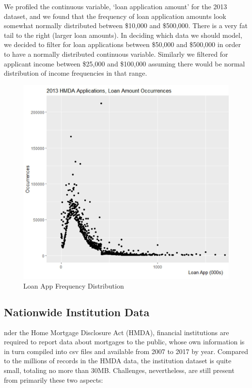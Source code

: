\documentclass[conference,compsoc]{IEEEtran}
\begin{document}
We profiled the continuous variable, ‘loan application amount’ for the 2013 dataset, and we found that the frequency of loan application amounts look somewhat normally distributed between \$10,000 and \$500,000.  There is a very fat tail to the right (larger loan amounts).  In deciding which data we should model, we decided to filter for loan applications between \$50,000 and \$500,000 in order to have a normally distributed continuous variable.  Similarly we filtered for applicant income between \$25,000 and \$100,000 assuming there would be normal distribution of income frequencies in that range. 

\begin{figure}[h!]
  \includegraphics[width=\linewidth]{Loan_App_Dist.jpg}
  \caption{Loan App Frequency Distribution}
  \label{fig:design}
\end{figure}


\subsection{Nationwide Institution Data}

nder the Home Mortgage Disclosure Act (HMDA), financial institutions are required to report data about mortgages to the public, whose own information is in turn compiled into csv files and available from 2007 to 2017 by year. Compared to the millions of records in the HMDA data, the institution dataset is quite small, totaling no more than 30MB. Challenges, nevertheless, are still present from primarily these two aspects: 
\end{document}
